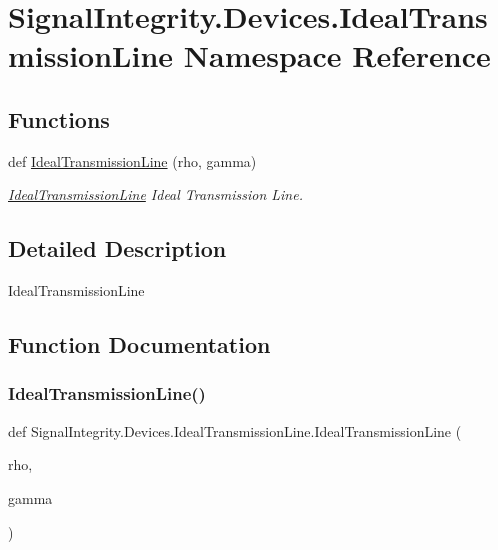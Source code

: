 \hypertarget{namespaceSignalIntegrity_1_1Devices_1_1IdealTransmissionLine}{}\section{Signal\+Integrity.\+Devices.\+Ideal\+Transmission\+Line Namespace Reference}
\label{namespaceSignalIntegrity_1_1Devices_1_1IdealTransmissionLine}
\subsection*{Functions}
\begin{DoxyCompactItemize}
\item 
def \hyperlink{namespaceSignalIntegrity_1_1Devices_1_1IdealTransmissionLine_a2a80f957bcab896e02afacf08c2c4c4f}{Ideal\+Transmission\+Line} (rho, gamma)
\begin{DoxyCompactList}\small\item\em \hyperlink{namespaceSignalIntegrity_1_1Devices_1_1IdealTransmissionLine}{Ideal\+Transmission\+Line} Ideal Transmission Line. \end{DoxyCompactList}\end{DoxyCompactItemize}


\subsection{Detailed Description}
\begin{DoxyVerb}IdealTransmissionLine\end{DoxyVerb}
 

\subsection{Function Documentation}
\mbox{\label{namespaceSignalIntegrity_1_1Devices_1_1IdealTransmissionLine_a2a80f957bcab896e02afacf08c2c4c4f}} 
\subsubsection{\texorpdfstring{Ideal\+Transmission\+Line()}{IdealTransmissionLine()}}
{\footnotesize\ttfamily def Signal\+Integrity.\+Devices.\+Ideal\+Transmission\+Line.\+Ideal\+Transmission\+Line (\begin{DoxyParamCaption}\item[{}]{rho,  }\item[{}]{gamma }\end{DoxyParamCaption})}



